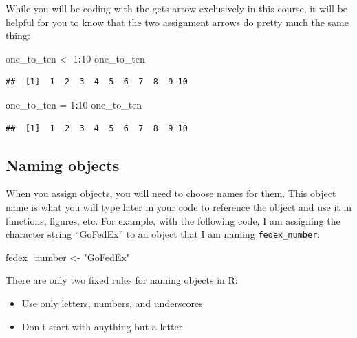 \documentclass[]{book}
\makeatletter
\newenvironment{Shaded}{\begin{snugshade}}{\end{snugshade}}
\newcommand{\DecValTok}[1]{\textcolor[rgb]{0.00,0.00,0.81}{#1}}
\newcommand{\StringTok}[1]{\textcolor[rgb]{0.31,0.60,0.02}{#1}}
\newcommand{\OperatorTok}[1]{\textcolor[rgb]{0.81,0.36,0.00}{\textbf{#1}}}
\newcommand{\NormalTok}[1]{#1}
\providecommand{\tightlist}{%
  \setlength{\itemsep}{0pt}\setlength{\parskip}{0pt}}
\newenvironment{kframe}{%
\medskip{}
\setlength{\fboxsep}{.8em}
 \def\at@end@of@kframe{}%
 \ifinner\ifhmode%
  \def\at@end@of@kframe{\end{minipage}}%
  \begin{minipage}{\columnwidth}%
 \fi\fi%
 \def\FrameCommand##1{\hskip\@totalleftmargin \hskip-\fboxsep
 \colorbox{shadecolor}{##1}\hskip-\fboxsep
     \hskip-\linewidth \hskip-\@totalleftmargin \hskip\columnwidth}%
 \MakeFramed {\advance\hsize-\width
   \@totalleftmargin\z@ \linewidth\hsize
   \@setminipage}}%
 {\par\unskip\endMakeFramed%
 \at@end@of@kframe}
\renewenvironment{Shaded}{\begin{kframe}}{\end{kframe}}
\theoremstyle{definition}
\theoremstyle{definition}
\theoremstyle{definition}
\theoremstyle{remark}
\makeatother
\begin{document}
While you will be coding with the gets arrow exclusively in this course,
it will be helpful for you to know that the two assignment arrows do
pretty much the same thing:

\begin{Shaded}
\begin{Highlighting}[]
\NormalTok{one_to_ten <-}\StringTok{ }\DecValTok{1}\OperatorTok{:}\DecValTok{10}
\NormalTok{one_to_ten}
\end{Highlighting}
\end{Shaded}

\begin{verbatim}
##  [1]  1  2  3  4  5  6  7  8  9 10
\end{verbatim}

\begin{Shaded}
\begin{Highlighting}[]
\NormalTok{one_to_ten =}\StringTok{ }\DecValTok{1}\OperatorTok{:}\DecValTok{10}
\NormalTok{one_to_ten}
\end{Highlighting}
\end{Shaded}

\begin{verbatim}
##  [1]  1  2  3  4  5  6  7  8  9 10
\end{verbatim}

\subsection{Naming objects}\label{naming-objects}

When you assign objects, you will need to choose names for them. This
object name is what you will type later in your code to reference the
object and use it in functions, figures, etc. For example, with the
following code, I am assigning the character string ``GoFedEx'' to an
object that I am naming \texttt{fedex\_number}:

\begin{Shaded}
\begin{Highlighting}[]
\NormalTok{fedex_number <-}\StringTok{ "GoFedEx"}
\end{Highlighting}
\end{Shaded}

There are only two fixed rules for naming objects in R:

\begin{itemize}
\tightlist
\item
  Use only letters, numbers, and underscores
\item
  Don't start with anything but a letter
\end{itemize}
\end{document}
